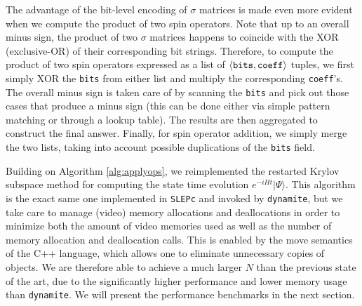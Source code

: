 \documentclass[preprint,12pt]{elsarticle}
\begin{document}
The advantage of the bit-level encoding of $\sigma$ matrices is made even more evident
when we compute the product of two spin operators. Note that up to an overall minus sign,
the product of two $\sigma$ matrices happens to coincide with the XOR (exclusive-OR) of
their corresponding bit strings. Therefore, to compute the product of two spin
operators expressed as a list of $\langle{\tt bits},{\tt coeff}\rangle$ tuples, we first
simply XOR the {\tt bits} from either list and multiply the corresponding {\tt coeff}'s. The
overall minus sign is taken care of by scanning the {\tt bits} and pick out those cases
that produce a minus sign (this can be done either via simple pattern matching or through
a lookup table). The results are then aggregated to construct the final answer. Finally,
for spin operator addition, we simply merge the two lists, taking into account possible
duplications of the {\tt bits} field.

Building on Algorithm \ref{alg:applyops}, we reimplemented the restarted Krylov subspace
method \cite{eiermann2006} for computing the state time evolution $e^{-iHt}|\Psi\rangle$.
This algorithm is the exact same one implemented in {\tt SLEPc} and invoked by {\tt dynamite},
but we take care to manage (video) memory allocations and deallocations in order to minimize
both the amount of video memories used as well as the number of memory allocation and
deallocation calls. This is enabled by the move semantics of the C++ language, which
allows one to eliminate unnecessary copies of objects. We are therefore able to achieve
a much larger $N$ than the previous state of the art, due to the significantly higher
performance and lower memory usage than {\tt dynamite}. We will present the performance
benchmarks in the next section.













\end{document}
